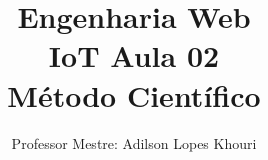 \documentclass[compress, hyperref={pdfpagelayout=SinglePage}]{beamer}
\title[IoT - Aula 02]{Engenharia Web \\ IoT Aula 02 \\ Método Científico}
\author{Professor Mestre: Adilson Lopes Khouri}
\begin{document}
	\begin{frame}
		\titlepage
	\end{frame}
	
	
	
	
	
	
					
	

	
	
\end{document}
